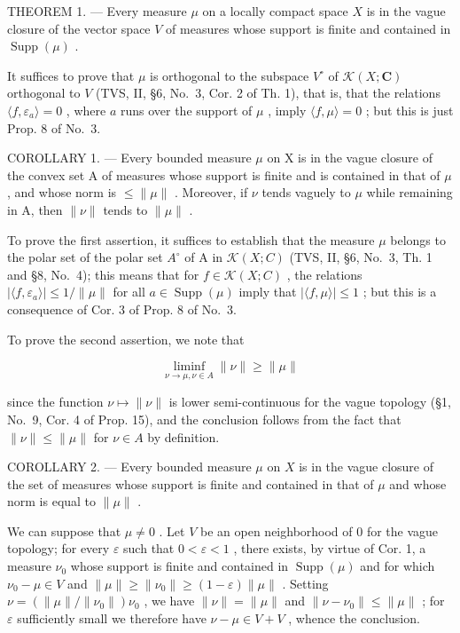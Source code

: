THEOREM 1. --- Every measure \(\mu\) on a locally compact space \(X\) is in the vague closure of the vector space \(V\) of measures whose support is finite and contained in \(\operatorname{Supp}(\mu)\) .

It suffices to prove that \(\mu\) is orthogonal to the subspace \(V^{\circ}\) of \(\mathcal{K}(X; \mathbf{C})\) orthogonal to \(V\) (TVS, II, §6, No.~3, Cor. 2 of Th. 1), that is, that the relations \(\langle f, \varepsilon_{a} \rangle = 0\) , where \(a\) runs over the support of \(\mu\) , imply \(\langle f, \mu \rangle = 0\) ; but this is just Prop. 8 of No.~3.

COROLLARY 1. --- Every bounded measure \(\mu\) on X is in the vague closure of the convex set A of measures whose support is finite and is contained in that of \(\mu\) , and whose norm is \(\leqslant \| \mu \|\) . Moreover, if \(\nu\) tends vaguely to \(\mu\) while remaining in A, then \(\| \nu \|\) tends to \(\| \mu \|\) .

To prove the first assertion, it suffices to establish that the measure \(\mu\) belongs to the polar set of the polar set \(A^{\circ}\) of A in \(\mathcal{K}(X;C)\) (TVS, II, §6, No.~3, Th. 1 and §8, No.~4); this means that for \(f \in \mathcal{K}(X;C)\) , the relations \(|\langle f,\varepsilon_{a}\rangle| \leqslant 1/\|\mu\|\) for all \(a \in \operatorname{Supp}(\mu)\) imply that \(|\langle f,\mu\rangle| \leqslant 1\) ; but this is a consequence of Cor. 3 of Prop. 8 of No.~3.

To prove the second assertion, we note that

\[
\liminf _ {\nu \to \mu ,   \nu \in A} \| \nu \| \geqslant \| \mu \|
\]

since the function \(\nu \mapsto \| \nu \|\) is lower semi-continuous for the vague topology (§1, No.~9, Cor. 4 of Prop. 15), and the conclusion follows from the fact that \(\| \nu \| \leqslant \| \mu \|\) for \(\nu \in A\) by definition.

COROLLARY 2. --- Every bounded measure \(\mu\) on \(X\) is in the vague closure of the set of measures whose support is finite and contained in that of \(\mu\) and whose norm is equal to \(\|\mu\|\) .

We can suppose that \(\mu \neq 0\) . Let \(V\) be an open neighborhood of 0 for the vague topology; for every \(\varepsilon\) such that \(0 < \varepsilon < 1\) , there exists, by virtue of Cor. 1, a measure \(\nu_0\) whose support is finite and contained in \(\operatorname{Supp}(\mu)\) and for which \(\nu_0 - \mu \in V\) and \(\| \mu \| \geqslant \| \nu_0 \| \geqslant (1 - \varepsilon) \| \mu \|\) . Setting \(\nu = (\| \mu \| / \| \nu_0 \|) \nu_0\) , we have \(\| \nu \| = \| \mu \|\) and \(\| \nu - \nu_0 \| \leqslant \| \mu \|\) ; for \(\varepsilon\) sufficiently small we therefore have \(\nu - \mu \in V + V\) , whence the conclusion.

